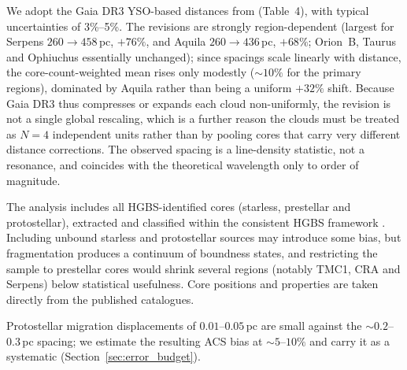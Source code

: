 \documentclass[usenatbib,twoside,twocolumn]{mnras}
\begin{document}
We adopt the Gaia DR3 YSO-based distances from \citet{Zhang2023} (Table~4), with typical uncertainties of 3\%--5\%. The revisions are strongly region-dependent (largest for Serpens $260\to458$\,pc, $+76\%$, and Aquila $260\to436$\,pc, $+68\%$; Orion~B, Taurus and Ophiuchus essentially unchanged); since spacings scale linearly with distance, the core-count-weighted mean rises only modestly ($\sim10\%$ for the primary regions), dominated by Aquila rather than being a uniform $+32\%$ shift. Because Gaia DR3 thus compresses or expands each cloud non-uniformly, the revision is not a single global rescaling, which is a further reason the clouds must be treated as $N=4$ independent units rather than by pooling cores that carry very different distance corrections. The observed spacing is a line-density statistic, not a resonance, and coincides with the theoretical wavelength only to order of magnitude.

The analysis includes all HGBS-identified cores (starless, prestellar and protostellar), extracted and classified within the consistent HGBS framework \citep{Konyves2015, Konyves2020}. Including unbound starless and protostellar sources may introduce some bias, but fragmentation produces a continuum of boundness states, and restricting the sample to prestellar cores would shrink several regions (notably TMC1, CRA and Serpens) below statistical usefulness. Core positions and properties are taken directly from the published catalogues.

Protostellar migration displacements of $0.01$--$0.05$\,pc \citep{Kirk2016, Mattern2018} are small against the $\sim0.2$--$0.3$\,pc spacing; we estimate the resulting ACS bias at $\sim5$--$10\%$ and carry it as a systematic (Section~\ref{sec:error_budget}).
\end{document}
